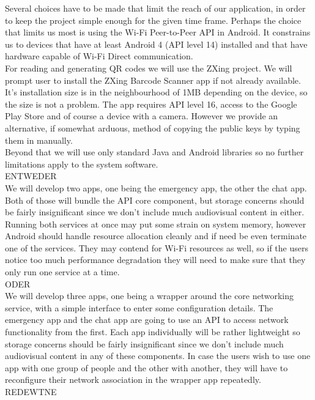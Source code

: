 Several choices have to be made that limit the reach of our application, in order to keep the project simple enough for the given time frame. Perhaps the choice that limits us most is using the Wi-Fi Peer-to-Peer API in Android. It constrains us to devices that have at least Android 4 (API level 14) installed and that have hardware capable of Wi-Fi Direct communication.\cite{P2PAPIGuide}\\
For reading and generating QR codes we will use the ZXing project\cite{ZXing}. We will prompt user to install the ZXing Barcode Scanner app if not already available. It's installation size is in the neighbourhood of 1MB depending on the device, so the size is not a problem. The app requires API level 16, access to the Google Play Store and of course a device with a camera. However we provide an alternative, if somewhat arduous, method of copying the public keys by typing them in manually.\\
Beyond that we will use only standard Java and Android libraries so no further limitations apply to the system software.\\

ENTWEDER\\

We will develop two apps, one being the emergency app, the other the chat app. Both of those will bundle the API core component, but storage concerns should be fairly insignificant since we don't include much audiovisual content in either. Running both services at once may put some strain on system memory, however Android should handle resource allocation cleanly and if need be even terminate one of the services. They may contend for Wi-Fi resources as well, so if the users notice too much performance degradation they will need to make sure that they only run one service at a time.\\

ODER\\

We will develop three apps, one being a wrapper around the core networking service, with a simple interface to enter some configuration details. The emergency app and the chat app are going to use an API to access network functionality from the first. Each app individually will be rather lightweight so storage concerns should be fairly insignificant since we don't include much audiovisual content in any of these components. In case the users wish to use one app with one group of people and the other with another, they will have to reconfigure their network association in the wrapper app repeatedly.\\

REDEWTNE\\
